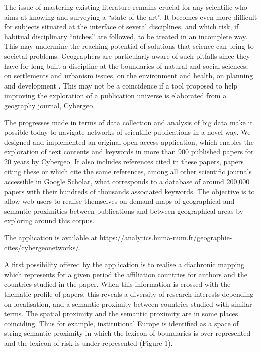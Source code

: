 \documentclass[11pt]{article}
\begin{document}
\bigskip

The issue of mastering existing literature remains crucial for any scientific who aims at knowing and surveying a ``state-of-the-art''. It becomes even more difficult for subjects situated at the interface of several disciplines, and which risk, if habitual disciplinary ``niches'' are followed, to be treated in an incomplete way. This may undermine the reaching potential of solutions that science can bring to societal problems. Geographers are particularly aware of such pitfalls since they have for long built a discipline at the boundaries of natural and social sciences, on settlements and urbanism issues, on the environment and health, on planning and development \citep{kosmopoulos2007citation}. This may not be a coincidence if a tool proposed to help improving the exploration of a publication universe is elaborated from a geography journal, Cybergeo.

\bigskip

The progresses made in terms of data collection and analysis of big data make it possible today to navigate networks of scientific publications in a novel way. We designed and implemented an original open-access application, which enables the exploration of text contents and keywords in more than 900 published papers for 20 years by Cybergeo. It also includes references cited in these papers, papers citing these or which cite the same references, among all other scientific journals accessible in Google Scholar, what corresponds to a database of around 200,000 papers with their hundreds of thousands associated keywords. The objective is to allow web users to realise themselves on demand maps of geographical and semantic proximities between publications and between geographical areas by exploring around this corpus.

\bigskip

The application is available at \url{https://analytics.huma-num.fr/geographie-cites/cybergeonetworks/}.

\bigskip

A first possibility offered by the application is to realise a diachronic mapping which represents for a given period the affiliation countries for authors and the countries studied in the paper. When this information is crossed with the thematic profile of papers, this reveals a diversity of research interests depending on localisation, and a semantic proximity between countries studied with similar terms. The spatial proximity and the semantic proximity are in some places coinciding. Thus for example, institutional Europe is identified as a space of string semantic proximity in which the lexicon of boundaries is over-represented and the lexicon of risk is under-represented (Figure 1).
\end{document}
